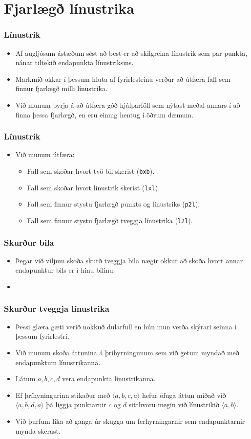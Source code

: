 \documentclass{beamer}
\newcommand\env[2]
{
	\begin{#1}
	#2
	\end{#1}
}
\newcommand\code[1]{\tiny}
\begin{document}
\section{Fjarlægð línustrika}

\env{frame}
{
	\frametitle{Línustrik}
	\env{itemize}
	{
		\item<1-> Af augljósum ástæðum sést að best er að skilgreina línustrik sem par punkta, nánar tiltekið endapunkta línustriksins.
		\item<2-> Markmið okkar í þessum hluta af fyrirlestrinu verður að útfæra fall sem finnur fjarlægð milli línustrika.
		\item<3-> Við munum byrja á að útfæra góð hjálparföll sem nýtast meðal annars í að finna þessa fjarlægð, en eru einnig
			hentug í öðrum dæmum.
	}
}

\env{frame}
{
	\frametitle{Línustrik}
	\env{itemize}
	{
		\item<1-> Við munum útfæra:
		\env{itemize}
		{
			\item<2-> Fall sem skoðar hvort tvö bil skerist (\texttt{bxb}).
			\item<3-> Fall sem skoðar hvort línustrik skerist (\texttt{lxl}).
			\item<4-> Fall sem finnur stystu fjarlægð punkts og línustriks (\texttt{p2l}).
			\item<5-> Fall sem finnur stystu fjarlægð tveggja línustrika (\texttt{l2l}).
		}
	}
}

\env{frame}
{
	\frametitle{Skurður bila}
	\env{itemize}
	{
		\item<1-> Þegar við viljum skoða skurð tveggja bila nægir okkur að skoða hvort annar endapunktur bils er í hinu bilinu.
		\item<2-> \code{bxb.h}
	}
}

\env{frame}
{
	\frametitle{Skurður tveggja línustrika}
	\env{itemize}
	{
		\item<1-> Þessi glæra gæti verið nokkuð dularfull en hún mun verða skýrari seinna í þessum fyrirlestri.
		\item<2-> Við munum skoða áttunina á þríhyrningunum sem við getum myndað með endapunktum línustrikanna.
		\item<3-> Látum $a, b, c, d$ vera endapunkta línustrikanna.
		\item<4-> Ef þríhyningurinn stikaður með $\langle a, b, c, a \rangle$ hefur öfuga áttun miðað við $\langle a, b, d, a \rangle$ þá liggja
			punktarnir $c$ og $d$ sitthvoru megin við línustrikið $\langle a, b \rangle$.
		\item<5-> Við þurfum líka að ganga úr skugga um ferhyrningarnir sem endapunktarnir mynda skerast.
	}
}
\end{document}
